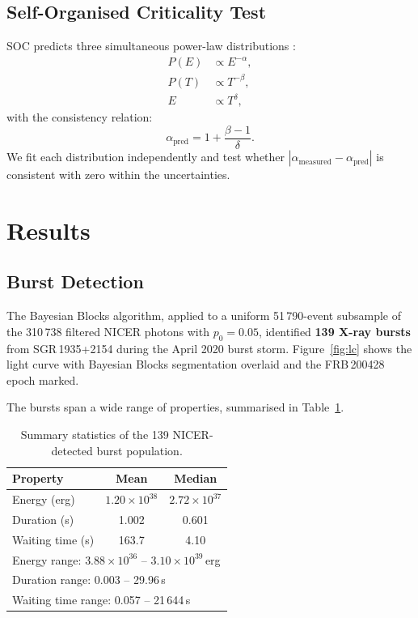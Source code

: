 \documentclass[12pt]{article}
\begin{document}
\subsection{Self-Organised Criticality Test}

SOC predicts three simultaneous power-law distributions
\citep{aschwanden2016}:
\begin{align}
    P(E) &\propto E^{-\alpha}, \label{eq:soc1}\\
    P(T) &\propto T^{-\beta},  \label{eq:soc2}\\
    E    &\propto T^{\delta},   \label{eq:soc3}
\end{align}
with the consistency relation:
\begin{equation}\label{eq:soc_relation}
    \alpha_{\mathrm{pred}} = 1 + \frac{\beta - 1}{\delta}.
\end{equation}
We fit each distribution independently and test whether
$|\alpha_{\mathrm{measured}} - \alpha_{\mathrm{pred}}|$ is consistent
with zero within the uncertainties.

\section{Results}\label{sec:results}

\subsection{Burst Detection}

The Bayesian Blocks algorithm, applied to a uniform 51\,790-event
subsample of the 310\,738 filtered NICER photons with $p_0 = 0.05$,
identified \textbf{139 X-ray bursts} from
SGR\,1935+2154 during the April 2020 burst storm. Figure~\ref{fig:lc}
shows the light curve with Bayesian Blocks segmentation overlaid and the
FRB\,200428 epoch marked.

The bursts span a wide range of properties, summarised in
Table~\ref{tab:burst_stats}.

\begin{table}[H]
\centering
\caption{Summary statistics of the 139 NICER-detected burst population.}
\label{tab:burst_stats}
\begin{tabular}{@{}lcc@{}}
\toprule
Property & Mean & Median \\
\midrule
Energy (erg)        & $1.20 \times 10^{38}$ & $2.72 \times 10^{37}$ \\
Duration (s)        & 1.002 & 0.601 \\
Waiting time (s)    & 163.7 & 4.10 \\
\midrule
\multicolumn{3}{l}{Energy range: $3.88 \times 10^{36}$ -- $3.10 \times 10^{39}$\,erg} \\
\multicolumn{3}{l}{Duration range: 0.003 -- 29.96\,s} \\
\multicolumn{3}{l}{Waiting time range: 0.057 -- 21\,644\,s} \\
\bottomrule
\end{tabular}
\end{table}
\end{document}
